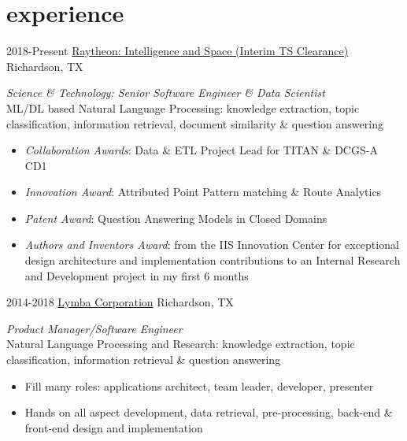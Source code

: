 \documentclass[]{friggeri-cv} %
\begin{document}

\section{experience }

\begin{entrylist}
\entry
{2018-Present}
{\href{http://www.raytheon.com}{Raytheon: Intelligence and Space {\normalfont (Interim TS Clearance)}}}
{Richardson, TX}
{\emph{Science \& Technology: Senior Software Engineer \& Data Scientist} \\
ML/DL based Natural Language Processing: knowledge extraction, topic classification, information retrieval, document similarity \& question answering
\begin{itemize}
\item \emph{Collaboration Awards}: Data \& ETL Project Lead for TITAN \& DCGS-A CD1
\item \emph{Innovation Award}: Attributed Point Pattern matching \& Route Analytics
\item \emph{Patent Award}: Question Answering Models in Closed Domains
\item \emph{Authors and Inventors Award}: from the IIS Innovation Center for exceptional design architecture and implementation contributions to an Internal Research and Development project in my first 6 months
\end{itemize}}
\entry
{2014-2018}
{\href{http://www.lymba.com}{Lymba Corporation}}
{Richardson, TX}
{\emph{Product Manager/Software Engineer} \\
Natural Language Processing and Research: knowledge extraction, topic classification, information retrieval \& question answering
\begin{itemize}
\item Fill many roles: applications architect, team leader, developer, presenter
\end{itemize}
\begin{itemize}
\item Hands on all aspect development, data retrieval, pre-processing, back-end \& front-end design and implementation
\end{itemize}}

\end{entrylist}
\end{document}
